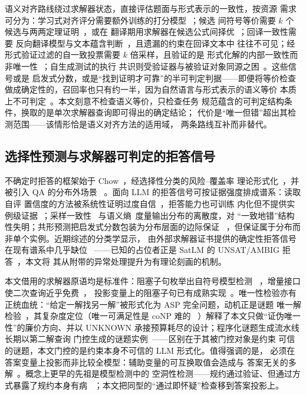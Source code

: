 \documentclass[letterpaper]{article}
\begin{document}
语义对齐路线绕过求解器状态，直接评估题面与形式表示的一致性，按资源
需求可分为：学习式对齐评分需要额外训练的打分模型~\cite{lu2025}；候选
间符号等价需要 $k$ 个候选与两两定理证明~\cite{li2024symbolic}，或在
翻译期用求解器在候选公式间择优~\cite{ryu2025}；回译一致性需要
反向翻译模型与文本蕴含判断~\cite{ying2024}，且遗漏的约束在回译文本中
往往不可见；经形式验证过滤的自一致投票需要 $k$ 倍采样，且验证的是
形式化解的内部一致性而非唯一性~\cite{zhou2024dtv}；自生成测试的执行
共识则受验证器与被验证对象同源之困~\cite{chen2023codet}。这些信号或是
启发式分数，或是``找到证明才可靠''的半可判定判据——即便将等价检查
做成确定性的，召回率也只有约一半，因为自然语言与形式表示的语义等价
本质上不可判定~\cite{poiroux2025}。本文刻意不检查语义等价，只检查任务
规范蕴含的可判定结构条件，换取的是单次求解器查询即可得出的确定结论；
代价是``唯一但错''超出其检测范围——该情形恰是语义对齐方法的适用域，
两条路线互补而非替代。

\subsection{选择性预测与求解器可判定的拒答信号}
\label{sec:rw-selective}

不确定时拒答的框架始于 Chow~\cite{chow1957}，经选择性分类的风险--覆盖率
理论形式化~\cite{elyaniv2010,geifman2017}，并被引入 QA 的分布外场景
~\cite{kamath2020}。面向 LLM 的拒答信号可按证据强度排成谱系：读取自评
置信度的方法被系统性证明过度自信~\cite{xiong2024}，拒答能力也可训练
内化但不提供实例级证据~\cite{zhang2024rtuning}；采样一致性
~\cite{wang2023}与语义熵~\cite{farquhar2024}度量输出分布的离散度，对
``一致地错''结构性失明；共形预测把启发式分数包装为分布层面的边际保证
~\cite{quach2024}，但保证属于分布而非单个实例。近期综述的分类学显示，
由外部求解器证书提供的确定性拒答信号在现有谱系中几乎缺位~\cite{wen2024}
——已知的占位者正是 SatLM 的 UNSAT/AMBIG 拒答~\cite{ye2023}，本文将
其从附带的异常处理提升为有理论刻画的机制。

本文借用的求解器原语均是标准件：阻塞子句枚举出自符号模型检测
~\cite{mcmillan2002}，增量接口使二次查询近乎免费~\cite{eensorensson2004}，
投影变量上的阻塞子句已有成熟实现~\cite{gebser2009}。唯一性检验亦有
正统血统：``给定一解找另一解''被形式化为 ASP 完全问题，动机正是谜题
唯一解检验~\cite{yato2003}，其复杂度定位（唯一可满足性是 coNP 难的
~\cite{valiant1986}）解释了本文只做``证伪唯一性''的廉价方向、并以
UNKNOWN 承接预算耗尽的设计；程序化谜题生成流水线长期以第二解查询
门控生成的谜题实例~\cite{dekegel2020}——区别在于其被门控对象是约束
可信的谜题，本文门控的是约束本身不可信的 LLM 形式化。值得强调的是，
必须在答案变量上投影而非比较全模型：辅助变量的可互换取值会造成与
答案无关的多解~\cite{freuder1991}。概念上更早的先祖是模型检测中的
空洞性检测——规约通过验证、但通过方式暴露了规约本身有病
~\cite{kupferman2003}；本文把同型的``通过即怀疑''检查移到答案投影上。
\end{document}
